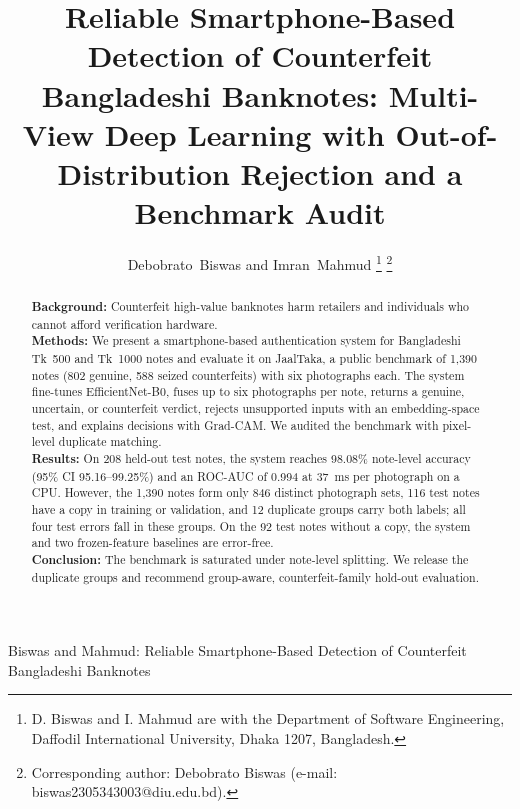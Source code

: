 \documentclass[journal]{IEEEtran}
\begin{document}
\title{Reliable Smartphone-Based Detection of Counterfeit Bangladeshi Banknotes:
Multi-View Deep Learning with Out-of-Distribution Rejection and a Benchmark Audit}

\author{Debobrato~Biswas and Imran~Mahmud%
\thanks{D. Biswas and I. Mahmud are with the Department of Software Engineering,
Daffodil International University, Dhaka 1207, Bangladesh.}%
\thanks{Corresponding author: Debobrato Biswas (e-mail: biswas2305343003@diu.edu.bd).}}

%
{Biswas and Mahmud: Reliable Smartphone-Based Detection of Counterfeit Bangladeshi Banknotes}

\maketitle

\begin{abstract}
\textbf{Background:} Counterfeit high-value banknotes harm retailers and individuals who
cannot afford verification hardware.\\
\textbf{Methods:} We present a smartphone-based authentication system for Bangladeshi
Tk~500 and Tk~1000 notes and evaluate it on JaalTaka, a public benchmark of 1{,}390
notes (802 genuine, 588 seized counterfeits) with six photographs each. The system
fine-tunes EfficientNet-B0, fuses up to six photographs per note, returns a genuine,
uncertain, or counterfeit verdict, rejects unsupported inputs with an embedding-space
test, and explains decisions with Grad-CAM. We audited the benchmark with pixel-level
duplicate matching.\\
\textbf{Results:} On 208 held-out test notes, the system reaches 98.08\% note-level
accuracy (95\% CI 95.16--99.25\%) and an ROC-AUC of 0.994 at 37~ms per photograph on a
CPU. However, the 1{,}390 notes form only 846 distinct photograph sets, 116 test notes
have a copy in training or validation, and 12 duplicate groups carry both labels; all
four test errors fall in these groups. On the 92 test notes without a copy, the system
and two frozen-feature baselines are error-free.\\
\textbf{Conclusion:} The benchmark is saturated under note-level splitting. We release
the duplicate groups and recommend group-aware, counterfeit-family hold-out evaluation.
\end{abstract}
\end{document}
